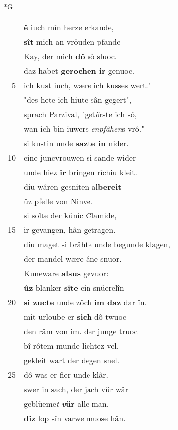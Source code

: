 \documentclass[8pt,a4paper,notitlepage]{article}
\begin{document}
\begin{table}[ht]
\begin{minipage}[t]{0.5\linewidth}
\small
\begin{center}*G
\end{center}
\begin{tabular}{rl}
 & \textbf{ê} iuch mîn herze erkande,\\ 
 & \textbf{sît} mich an vröuden pfande\\ 
 & Kay, der mich \textbf{dô} sô sluoc.\\ 
 & daz habet \textbf{gerochen ir} genuoc.\\ 
5 & ich kust iuch, wære ich kusses wert."\\ 
 & "des hete ich hiute sân gegert",\\ 
 & sprach Parzival, "get\textit{ö}rste ich sô,\\ 
 & wan ich bin iuwers \textit{enpfâhen}s vrô."\\ 
 & si kustin unde \textbf{sazte in} nider.\\ 
10 & eine juncvrouwen si sande wider\\ 
 & unde hiez \textbf{ir} bringen rîchiu kleit.\\ 
 & diu wâren gesniten al\textbf{bereit}\\ 
 & ûz pfelle von Ninve.\\ 
 & si solte der künic Clamide,\\ 
15 & ir gevangen, hân getragen.\\ 
 & diu maget si brâhte unde begunde klagen,\\ 
 & der mandel wære âne snuor.\\ 
 & Kuneware \textbf{alsus} gevuor:\\ 
 & \textbf{ûz} blanker \textbf{sîte} ein snüerelîn\\ 
20 & \textbf{si zucte} unde zôch \textbf{im daz} dar în.\\ 
 & mit urloube er \textbf{sich} dô twuoc\\ 
 & den râm von im. der junge truoc\\ 
 & bî rôtem munde liehtez vel.\\ 
 & gekleit wart der degen snel.\\ 
25 & dô was er fier unde klâr.\\ 
 & swer in sach, der jach vür wâr\\ 
 & geblüeme\textit{t} \textbf{\textit{v}ür} alle man.\\ 
 & \textbf{diz} lop sîn varwe muose hân.\\ 

\end{tabular}
\end{minipage}
\end{table}
\end{document}
